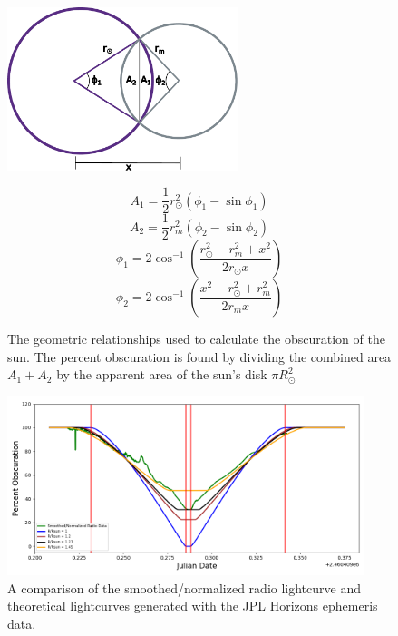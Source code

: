 \begin{figure}
\begin{minipage}{0.49\textwidth}
  \includegraphics[width=0.6\textwidth]{figures/drawing_updated}
  \caption{\label{fig:eclipse_geometry} The geometric relationships used to calculate the obscuration of the sun. The percent obscuration is found by dividing the combined area $A_1 + A_2$ by the apparent area of the sun's disk $\pi R_\odot^2$}
\end{minipage}
\hfill
\begin{minipage}{0.49\textwidth}
\begin{equation}\label{eq:geometry_1}
  A_1 = \frac{1}{2}r_{\odot}^2\left(\phi_1 - \sin\phi_1\right)
\end{equation}
\begin{equation}\label{eq:geometry_2}
  A_2 = \frac{1}{2}r_{m}^2\left(\phi_2 - \sin\phi_2\right)
\end{equation}
\begin{equation}\label{eq:geometry_3}
  \phi_1 = 2\cos^{-1}\left(\frac{r_{\odot}^2 - r_{m}^2+x^2}{2r_{\odot}x}\right)
\end{equation}
\begin{equation}\label{eq:geometry_4}
  \phi_2 = 2\cos^{-1}\left(\frac{x^2 - r_{\odot}^2 + r_{m}^2}{2r_{m}x}\right)
\end{equation}
\end{minipage}
\end{figure}



\begin{figure}
  \includegraphics[width=0.93\textwidth]{figures/RadiovsTheoretical}
  \caption{\label{fig:RadiovsTheoretical} A comparison of the smoothed/normalized radio lightcurve and theoretical lightcurves generated with the JPL Horizons ephemeris data.}
\end{figure}


